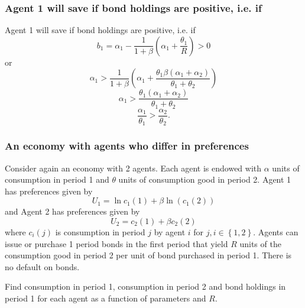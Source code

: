 \documentclass[aspectratio=169]{ltx-talk}
\begin{document}
\begin{frame}
\frametitle{Agent 1 will save if bond holdings are positive, i.e. if}
Agent 1 will save if bond holdings are positive, i.e. if 
\begin{equation*}
b_{1}=\alpha _{1}-\frac{1}{1+\beta }\left( \alpha _{1}+\frac{\theta _{1}}{R}%
\right) >0
\end{equation*}%
or%
\begin{equation*}
\alpha _{1}>\frac{1}{1+\beta }\left( \alpha _{1}+\frac{\theta _{1}\beta
\left( \alpha _{1}+\alpha _{2}\right) }{\theta _{1}+\theta _{2}}\right)
\end{equation*}%
\begin{equation*}
\alpha _{1}>\frac{\theta _{1}\left( \alpha _{1}+\alpha _{2}\right) }{\theta
_{1}+\theta _{2}}
\end{equation*}%
\begin{equation*}
\frac{\alpha _{1}}{\theta _{1}}>\frac{\alpha _{2}}{\theta _{2}}.
\end{equation*}
\end{frame}

\begin{frame}
\frametitle{An economy with agents who differ in preferences}
Consider again an economy with 2 agents. Each agent is endowed with $\alpha $
units of consumption in period 1 and $\theta $ units of consumption good in
period 2. Agent 1 has preferences given by 
\begin{equation*}
U_{1}=\ln c_{1}\left( 1\right) +\beta \ln \left( c_{1}\left( 2\right) \right)
\end{equation*}%
and Agent 2 has preferences given by 
\begin{equation*}
U_{2}=c_{2}\left( 1\right) +\beta c_{2}\left( 2\right)
\end{equation*}%
where $c_{i}\left( j\right) $ is consumption in period $j$ by agent $i$ for $%
j,i\in \left\{ 1,2\right\} .$ Agents can issue or purchase 1 period bonds in
the first period that yield $R$ units of the consumption good in period 2
per unit of bond purchased in period 1. There is no default on bonds.

Find consumption in period 1, consumption in period 2 and bond holdings in
period 1 for each agent as a function of parameters and $R.$\newline
\end{frame}
\end{document}
